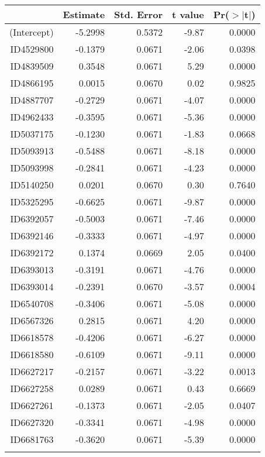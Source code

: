 \begin{table}[ht]
\centering
\begin{tabular}{rrrrr}
  \hline
 & Estimate & Std. Error & t value & Pr($>$$|$t$|$) \\ 
  \hline
(Intercept) & -5.2998 & 0.5372 & -9.87 & 0.0000 \\ 
  ID4529800 & -0.1379 & 0.0671 & -2.06 & 0.0398 \\ 
  ID4839509 & 0.3548 & 0.0671 & 5.29 & 0.0000 \\ 
  ID4866195 & 0.0015 & 0.0670 & 0.02 & 0.9825 \\ 
  ID4887707 & -0.2729 & 0.0671 & -4.07 & 0.0000 \\ 
  ID4962433 & -0.3595 & 0.0671 & -5.36 & 0.0000 \\ 
  ID5037175 & -0.1230 & 0.0671 & -1.83 & 0.0668 \\ 
  ID5093913 & -0.5488 & 0.0671 & -8.18 & 0.0000 \\ 
  ID5093998 & -0.2841 & 0.0671 & -4.23 & 0.0000 \\ 
  ID5140250 & 0.0201 & 0.0670 & 0.30 & 0.7640 \\ 
  ID5325295 & -0.6625 & 0.0671 & -9.87 & 0.0000 \\ 
  ID6392057 & -0.5003 & 0.0671 & -7.46 & 0.0000 \\ 
  ID6392146 & -0.3333 & 0.0671 & -4.97 & 0.0000 \\ 
  ID6392172 & 0.1374 & 0.0669 & 2.05 & 0.0400 \\ 
  ID6393013 & -0.3191 & 0.0671 & -4.76 & 0.0000 \\ 
  ID6393014 & -0.2391 & 0.0670 & -3.57 & 0.0004 \\ 
  ID6540708 & -0.3406 & 0.0671 & -5.08 & 0.0000 \\ 
  ID6567326 & 0.2815 & 0.0671 & 4.20 & 0.0000 \\ 
  ID6618578 & -0.4206 & 0.0671 & -6.27 & 0.0000 \\ 
  ID6618580 & -0.6109 & 0.0671 & -9.11 & 0.0000 \\ 
  ID6627217 & -0.2157 & 0.0671 & -3.22 & 0.0013 \\ 
  ID6627258 & 0.0289 & 0.0671 & 0.43 & 0.6669 \\ 
  ID6627261 & -0.1373 & 0.0671 & -2.05 & 0.0407 \\ 
  ID6627320 & -0.3341 & 0.0671 & -4.98 & 0.0000 \\ 
  ID6681763 & -0.3620 & 0.0671 & -5.39 & 0.0000 \\ 
$$
\end{tabular}
\end{table}
